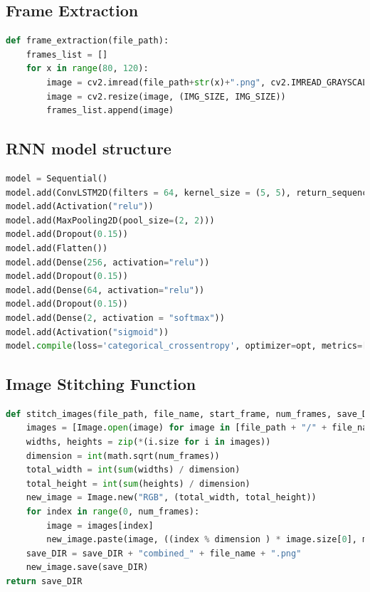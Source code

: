 \documentclass[12pt]{article}
\numberwithin{figure}{section} %
\begin{document}
\subsection{Frame Extraction}
\begin{lstlisting}[language = Python]
def frame_extraction(file_path):
    frames_list = []
    for x in range(80, 120):
        image = cv2.imread(file_path+str(x)+".png", cv2.IMREAD_GRAYSCALE)
        image = cv2.resize(image, (IMG_SIZE, IMG_SIZE))
        frames_list.append(image)
\end{lstlisting}

\subsection{RNN model structure}
\begin{lstlisting}[language = Python]
model = Sequential()
model.add(ConvLSTM2D(filters = 64, kernel_size = (5, 5), return_sequences = False, data_format = "channels_last", input_shape = X.shape[1:]))
model.add(Activation("relu"))
model.add(MaxPooling2D(pool_size=(2, 2)))
model.add(Dropout(0.15))
model.add(Flatten())
model.add(Dense(256, activation="relu"))
model.add(Dropout(0.15))
model.add(Dense(64, activation="relu"))
model.add(Dropout(0.15))
model.add(Dense(2, activation = "softmax"))
model.add(Activation("sigmoid"))
model.compile(loss='categorical_crossentropy', optimizer=opt, metrics=["accuracy"])
\end{lstlisting}

\subsection{Image Stitching Function}
\begin{lstlisting}[language = Python]
def stitch_images(file_path, file_name, start_frame, num_frames, save_DIR):
    images = [Image.open(image) for image in [file_path + "/" + file_name + str(x) + ".png" for x in range(start_frame, start_frame + num_frames)]]
    widths, heights = zip(*(i.size for i in images))
    dimension = int(math.sqrt(num_frames))
    total_width = int(sum(widths) / dimension)
    total_height = int(sum(heights) / dimension)
    new_image = Image.new("RGB", (total_width, total_height))
    for index in range(0, num_frames):
        image = images[index]
        new_image.paste(image, ((index % dimension ) * image.size[0], math.floor(index / dimension) * image.size[1]))
    save_DIR = save_DIR + "combined_" + file_name + ".png"
    new_image.save(save_DIR)
return save_DIR
\end{lstlisting}
\end{document}
